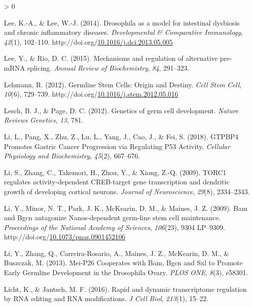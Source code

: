 \documentclass[12pt,oneside]{reedthesis}
\newlength{\cslhangindent}
\newenvironment{CSLReferences}[2] %
 {%
  \setlength{\parindent}{0pt}
  \ifodd #1 \everypar{\setlength{\hangindent}{\cslhangindent}}\ignorespaces\fi
  \ifnum #2 > 0
  \setlength{\parskip}{#2\baselineskip}
  \fi
 }%
 {}
\begin{document}
\begin{CSLReferences}{1}{0}
\leavevmode\hypertarget{ref-Lee2014c}{}%
Lee, K.-A., \& Lee, W.-J. (2014). Drosophila as a model for intestinal dysbiosis and chronic inflammatory diseases. \emph{Developmental \& Comparative Immunology}, \emph{42}(1), 102--110. http://doi.org/\href{https://doi.org/10.1016/j.dci.2013.05.005}{10.1016/j.dci.2013.05.005}

\leavevmode\hypertarget{ref-Lee2015}{}%
Lee, Y., \& Rio, D. C. (2015). Mechanisms and regulation of alternative pre-{mRNA} splicing. \emph{Annual Review of Biochemistry}, \emph{84}, 291--323.

\leavevmode\hypertarget{ref-lehmannGermlineStemCells2012}{}%
Lehmann, R. (2012). Germline {Stem Cells}: {Origin} and {Destiny}. \emph{Cell Stem Cell}, \emph{10}(6), 729--739. http://doi.org/\href{https://doi.org/10.1016/j.stem.2012.05.016}{10.1016/j.stem.2012.05.016}

\leavevmode\hypertarget{ref-Lesch2012b}{}%
Lesch, B. J., \& Page, D. C. (2012). Genetics of germ cell development. \emph{Nature Reviews Genetics}, \emph{13}, 781.

\leavevmode\hypertarget{ref-Li2018a}{}%
Li, L., Pang, X., Zhu, Z., Lu, L., Yang, J., Cao, J., \& Fei, S. (2018). {GTPBP4 Promotes Gastric Cancer Progression} via {Regulating P53 Activity}. \emph{Cellular Physiology and Biochemistry}, \emph{45}(2), 667--676.

\leavevmode\hypertarget{ref-Li2009n}{}%
Li, S., Zhang, C., Takemori, H., Zhou, Y., \& Xiong, Z.-Q. (2009). {TORC1} regulates activity-dependent {CREB-target} gene transcription and dendritic growth of developing cortical neurons. \emph{Journal of Neuroscience}, \emph{29}(8), 2334--2343.

\leavevmode\hypertarget{ref-Li2009h}{}%
Li, Y., Minor, N. T., Park, J. K., McKearin, D. M., \& Maines, J. Z. (2009). Bam and {Bgcn} antagonize {Nanos-dependent} germ-line stem cell maintenance. \emph{Proceedings of the National Academy of Sciences}, \emph{106}(23), 9304 LP--9309. http://doi.org/\href{https://doi.org/10.1073/pnas.0901452106}{10.1073/pnas.0901452106}

\leavevmode\hypertarget{ref-Li2013h}{}%
Li, Y., Zhang, Q., Carreira-Rosario, A., Maines, J. Z., McKearin, D. M., \& Buszczak, M. (2013). Mei-{P26 Cooperates} with {Bam}, {Bgcn} and {Sxl} to {Promote Early Germline Development} in the {Drosophila Ovary}. \emph{PLOS ONE}, \emph{8}(3), e58301.

\leavevmode\hypertarget{ref-Licht2016}{}%
Licht, K., \& Jantsch, M. F. (2016). Rapid and dynamic transcriptome regulation by {RNA} editing and {RNA} modifications. \emph{J Cell Biol}, \emph{213}(1), 15--22.


\end{CSLReferences}
\end{document}
